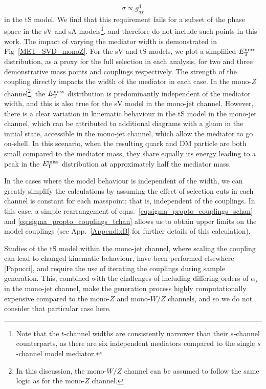 \begin{equation}
  \sigma \propto g_{q \chi}^4
  \label{eq:sigma_propto_couplings_tchan}
\end{equation}
in the tS model. We find that this requirement fails for a subset of the phase space in the sV and sA models\footnote{Note that the $t$-channel widths are consistently narrower than their $s$-channel counterparts,  as there are six independent mediators compared to the single $s$-channel model mediator.}, and therefore do not include such points in this work.
The impact of varying the mediator width is demonstrated in Fig~\ref{MET_SVD_monoZ}. For the sV and tS models, we plot a simplified $E_{\mathrm{T}}^{\mathrm{miss}}$ distribution, as a proxy for the full selection in each analysis, for two and three demonstrative mass points and couplings respectively.  The strength of the coupling directly impacts the width of the mediator in each case. In the mono-$Z$ channel\footnote{In this discussion, the mono-$W/Z$ channel can be assumed to follow the same logic as for the mono-$Z$ channel.}, the $E_{\mathrm{T}}^{\mathrm{miss}}$ distribution is predominantly independent of the mediator width, and this is also true for the sV model in the mono-jet channel. However, there is a clear variation in kinematic behaviour in the tS model in the mono-jet channel, which can be attributed to additional diagrams with a gluon in the initial state, accessible in the mono-jet channel, which allow the mediator to go on-shell. In this scenario, when the resulting quark and DM particle are both small compared to the mediator mass, they share equally its energy leading to a peak in the $E_{\mathrm{T}}^{\mathrm{miss}}$ distribution at approximately half the mediator mass.

In the cases where the model behaviour is independent of the width, we can greatly simplify the calculations by assuming the effect of selection cuts in each channel is constant for each masspoint; that is, independent of the couplings. In this case, a simple rearrangement of eqns.~\ref{eq:sigma_propto_couplings_schan} and \ref{eq:sigma_propto_couplings_tchan} allows us to obtain upper limits on the model couplings (see App.~\ref{AppendixB} for further details of this calculation).

Studies of the tS model within the mono-jet channel, where scaling the coupling can lead to changed kinematic behaviour, have been performed elsewhere [Papucci], and require the use of iterating the couplings during sample generation. This, combined with the challenges of including differing orders of $\alpha_s$ in the mono-jet channel, make the generation process highly computationally expensive compared to the mono-$Z$ and mono-$W/Z$ channels, and so we do not consider that particular case here.

